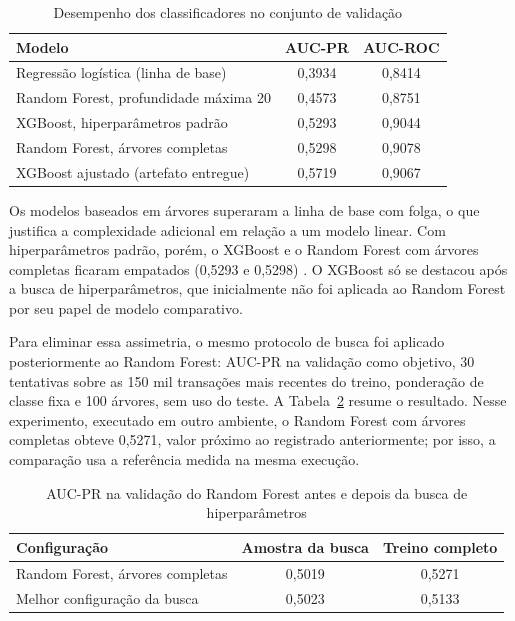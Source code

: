 \begin{table}[htb]
    \caption{Desempenho dos classificadores no conjunto de validação}
    \label{tab:modelos}
    \centering
    \begin{tabular}{lcc}
        \hline
        Modelo & AUC-PR & AUC-ROC \\
        \hline
        Regressão logística (linha de base) & 0,3934 & 0,8414 \\
        Random Forest, profundidade máxima 20 & 0,4573 & 0,8751 \\
        XGBoost, hiperparâmetros padrão & 0,5293 & 0,9044 \\
        Random Forest, árvores completas & 0,5298 & 0,9078 \\
        XGBoost ajustado (artefato entregue) & 0,5719 & 0,9067 \\
        \hline
    \end{tabular}
\end{table}

Os modelos baseados em árvores superaram a linha de base com folga, o que justifica a complexidade adicional em relação a um modelo linear. Com hiperparâmetros padrão, porém, o XGBoost e o Random Forest com árvores completas ficaram empatados (0,5293 e 0,5298) \cite{chen2016xgboost,breiman2001random}. O XGBoost só se destacou após a busca de hiperparâmetros, que inicialmente não foi aplicada ao Random Forest por seu papel de modelo comparativo.

Para eliminar essa assimetria, o mesmo protocolo de busca foi aplicado posteriormente ao Random Forest: AUC-PR na validação como objetivo, 30 tentativas sobre as 150 mil transações mais recentes do treino, ponderação de classe fixa e 100 árvores, sem uso do teste. A Tabela~\ref{tab:rfbusca} resume o resultado. Nesse experimento, executado em outro ambiente, o Random Forest com árvores completas obteve 0,5271, valor próximo ao registrado anteriormente; por isso, a comparação usa a referência medida na mesma execução.

\begin{table}[htb]
    \caption{AUC-PR na validação do Random Forest antes e depois da busca de hiperparâmetros}
    \label{tab:rfbusca}
    \centering
    \begin{tabular}{lcc}
        \hline
        Configuração & Amostra da busca & Treino completo \\
        \hline
        Random Forest, árvores completas & 0,5019 & 0,5271 \\
        Melhor configuração da busca & 0,5023 & 0,5133 \\
        \hline
    \end{tabular}
\end{table}

